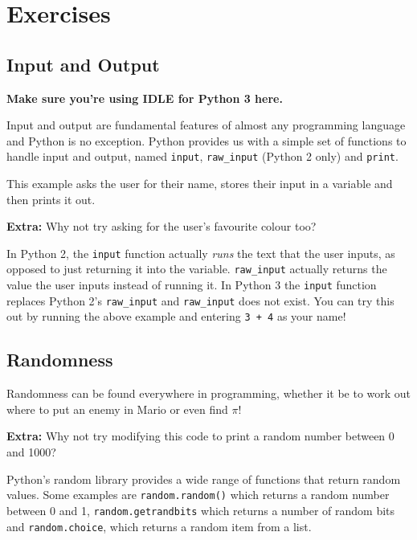 \section{Exercises}
	\subsection{Input and Output}
		\textbf{Make sure you're using IDLE for Python 3 here.}

		Input and output are fundamental features of almost any programming language and Python is no exception. Python provides us with a simple set of functions to handle input and output, named \texttt{input}, \texttt{raw\_input} (Python 2 only) and \texttt{print}.

		

		This example asks the user for their name, stores their input in a variable and then prints it out.

		\textbf{Extra:} Why not try asking for the user's favourite colour too?

		\begin{aside}
			In Python 2, the \texttt{input} function actually \textit{runs} the text that the user inputs, as opposed to just returning it into the variable. \texttt{raw\_input} actually returns the value the user inputs instead of running it. In Python 3 the \texttt{input} function replaces Python 2's \texttt{raw\_input} and \texttt{raw\_input} does not exist. You can try this out by running the above example and entering \texttt{3 + 4} as your name!
		\end{aside}

	\subsection{Randomness}

		Randomness can be found everywhere in programming, whether it be to work out where to put an enemy in Mario or even find $\pi$!

		

		\textbf{Extra:} Why not try modifying this code to print a random number between 0 and 1000?

		\begin{aside}
			Python's random library provides a wide range of functions that return random values. Some examples are \texttt{random.random()} which returns a random number between 0 and 1, \texttt{random.getrandbits} which returns a number of random bits and \texttt{random.choice}, which returns a random item from a list.
		\end{aside}

